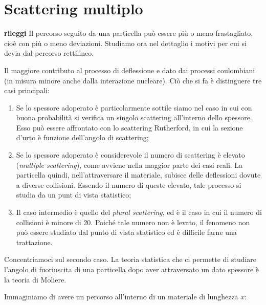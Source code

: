 \section{Scattering multiplo}

\textbf{rileggi}
Il percorso seguito da una particella può essere più o meno frastagliato, cioè con più o meno deviazioni. Studiamo ora nel dettaglio i motivi per cui si devia dal percorso rettilineo.

Il maggiore contributo al processo di deflessione e dato dai processi coulombiani (in misura minore anche dalla interazione nucleare). Ciò che si fa è distinguere tre casi principali:

\begin{enumerate}
    \item Se lo spessore adoperato è particolarmente sottile siamo nel caso in cui con buona probabilità si verifica un singolo scattering all'interno dello spessore. Esso può essere affrontato con lo scattering Rutherford, in cui la sezione d'urto è funzione dell'angolo di scattering;
    \item Se lo spessore adoperato è considerevole il numero di scattering è elevato (\textit{multiple scattering}), come avviene nella maggior parte dei casi reali. La particella quindi, nell'attraversare il materiale, subisce delle deflessioni dovute a diverse collisioni. Essendo il numero di queste elevato, tale processo si studia da un punt di vista statistico;
    \item Il caso intermedio è quello del \textit{plural scattering}, ed è il caso in cui il numero di collisioni è minore di 20. Poiché tale numero non è levato, il fenomeno non può essere studiato dal punto di vista statistico ed è difficile farne una trattazione.
\end{enumerate}

Concentriamoci sul secondo caso. La teoria statistica che ci permette di studiare l'angolo di fuoriuscita di una particella dopo aver attraversato un dato spessore è la teoria di Moliere.

Immaginiamo di avere un percorso all'interno di un materiale di lunghezza $x$:

\vspace{-0.2cm}

